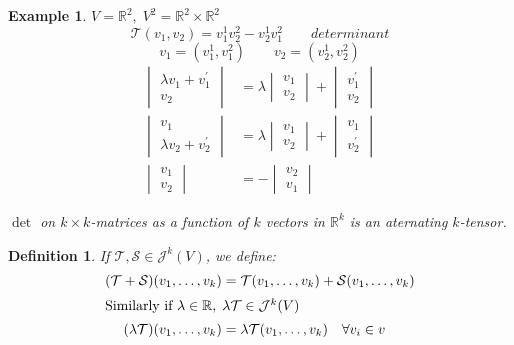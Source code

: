 \documentclass[11pt]{article}
\def\RR{\mathbb{R}}
\newtheorem{definition}{Definition}[section]
\newtheorem{example}{Example}[section]
\begin{document}
\begin{example} $V=\RR^2 , \; V^2 = \RR^2 \times \RR^2$
\[\mathcal{T}(v_1, v_2) = v_1^1v_2^2 - v_2^1v_1^2 \qquad \boxed{determinant}\]
\[v_1=(v_1^1, v_1^2) \qquad v_2=(v_2^1, v_2^2)\]
\begin{align*}
\begin{vmatrix} \lambda v_1 + v_1^{'} \\ v_2 \end{vmatrix} &= \lambda\begin{vmatrix} v_1 \\ v_2 \end{vmatrix} + \begin{vmatrix} v_1^{'} \\ v_2 \end{vmatrix} \\
\begin{vmatrix} v_1\\ \lambda v_2 + v_2^{'} \end{vmatrix} &= \lambda\begin{vmatrix} v_1 \\ v_2 \end{vmatrix} + \begin{vmatrix} v_1 \\ v_2^{'} \end{vmatrix}\\
\begin{vmatrix} v_1 \\ v_2 \end{vmatrix} &= -\begin{vmatrix} v_2 \\ v_1 \end{vmatrix}
\end{align*}



$\det$ on $k\times k$-matrices as a function of $k$ vectors in $\RR^k$ is an aternating $k$-tensor. 
\end{example}

\begin{definition}
If $\mathcal{T},\mathcal{S} \in \mathcal{J}^k(V)$, we define:
\begin{align*}
(\mathcal{T} + \mathcal{S})(v_1, \dots , v_k) &= \mathcal{T}(v_1, \dots , v_k) + \mathcal{S}(v_1, \dots , v_k)\\
\intertext{Similarly if $\lambda \in \RR, \; \lambda\mathcal{T} \in \mathcal{J}^k(V)$}
(\lambda\mathcal{T})(v_1, \dots , v_k) &= \lambda\mathcal{T}(v_1, \dots , v_k)\quad \forall v_i \in v
\end{align*}
\end{definition}
\end{document}
